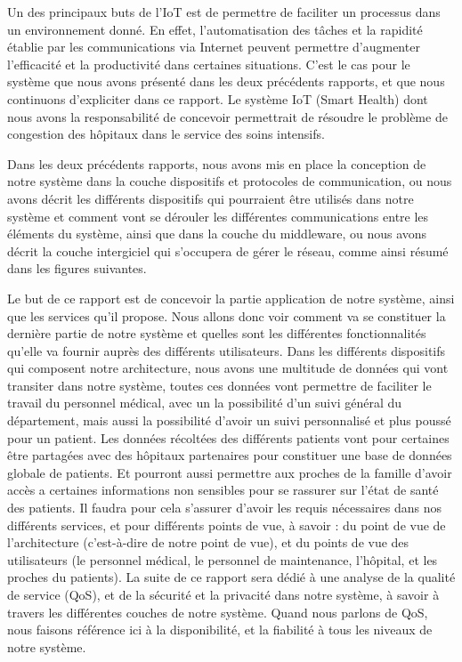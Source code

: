 Un des principaux buts de l’IoT est de permettre de faciliter un processus dans un environnement donné. En effet, l’automatisation
des tâches et la rapidité établie par les communications via Internet peuvent permettre d’augmenter l’efficacité et la
productivité dans certaines situations. C’est le cas pour le système que nous avons présenté dans les deux précédents rapports, et
que nous continuons d’expliciter dans ce rapport. Le système IoT (Smart Health) dont nous avons la responsabilité de concevoir
permettrait de résoudre le problème de congestion des hôpitaux dans le service des soins intensifs.  
\newline

Dans les deux précédents rapports, nous avons mis en place la conception de notre système dans la couche dispositifs et protocoles
de communication, ou nous avons décrit les différents dispositifs qui pourraient être utilisés dans notre système et comment vont
se dérouler les différentes communications entre les éléments du système, ainsi que dans la couche du middleware, ou nous avons
décrit la couche intergiciel qui s’occupera de gérer le réseau, comme ainsi résumé dans les figures suivantes.  
\newline

Le but de ce rapport est de concevoir la partie application de notre système, ainsi que les services qu’il propose. Nous allons
donc voir comment va se constituer la dernière partie de notre système et quelles sont les différentes fonctionnalités qu’elle va
fournir auprès des différents utilisateurs. Dans les différents dispositifs qui composent notre architecture, nous avons une
multitude de données qui vont transiter dans notre système, toutes ces données vont permettre de faciliter le travail du personnel
médical, avec un la possibilité d’un suivi général du département, mais aussi la possibilité d’avoir un suivi personnalisé et plus
poussé pour un patient. Les données récoltées des différents patients vont pour certaines être partagées avec des hôpitaux
partenaires pour constituer une base de données globale de patients. Et pourront aussi permettre aux proches de la famille d’avoir
accès a certaines informations non sensibles pour se rassurer sur l'état de santé des patients. Il faudra pour cela s’assurer
d’avoir les requis nécessaires dans nos différents services, et pour différents points de vue, à savoir : du point de vue de
l’architecture (c’est-à-dire de notre point de vue), et du points de vue des utilisateurs (le personnel médical, le personnel de
maintenance, l’hôpital, et les proches du patients). La suite de ce rapport sera dédié à une analyse de la qualité de service
(QoS), et de la sécurité et la privacité dans notre système, à savoir à travers les différentes couches de notre système. Quand
nous parlons de QoS, nous faisons référence ici à la disponibilité, et la fiabilité à tous les niveaux de notre système. 


